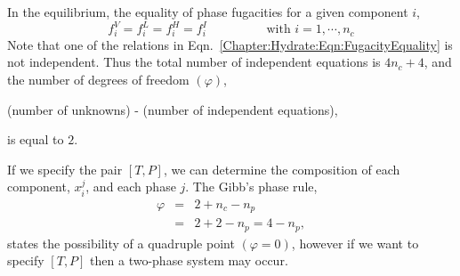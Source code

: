 In the equilibrium, the equality of phase fugacities for a given component $i$,
   \begin{equation}
      f_{i}^{V} = f_{i}^{L} = f_{i}^{H} = f_{i}^{I} \hspace{2cm}\text{with } i=1,\cdots,n_{c} \label{Chapter:Hydrate:Eqn:FugacityEquality}
   \end{equation}
Note that one of the relations in Eqn.~\ref{Chapter:Hydrate:Eqn:FugacityEquality} is not independent. Thus the total number of independent equations is $4n_{c}+4$, and the number of degrees of freedom $\left(\varphi\right)$, \ie   \begin{center} 
 (number of unknowns) - (number of independent equations),
   \end{center}
is equal to $2$.

If we specify the pair $\left[T,P\right]$, we can determine the composition of each component, $x_{i}^{j}$, and each phase $j$. The Gibb's phase rule,
  \begin{eqnarray}
     \varphi &=& 2 + n_{c} - n_{p} \\ \nonumber
             &=& 2 + 2 - n_{p} = 4 - n_{p},
  \end{eqnarray}
states the possibility of a quadruple point $\left(\varphi=0\right)$, however if we want to specify $\left[T,P\right]$ then a two-phase system may occur.
